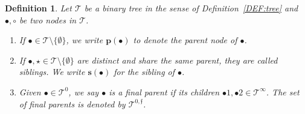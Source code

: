 \documentclass[%
11pt,  reqno]{amsart}
\newcommand{\5}{\textup{V}}
\newtheorem{definition}[theorem]{Definition}
\theoremstyle{remark}
\newcommand{\bul}{\bullet}
\newcommand{\TT}{\mathcal{T}}
\newcommand{\pb}{\mathbf{p}}
\newcommand{\gb}{\mathbf{g}}
\newcommand{\sbf}{\mathbf{s}}
\newcommand{\ff}{\mathfrak{f}}
\numberwithin{equation}{section}
\numberwithin{theorem}{section}
\begin{document}
\begin{definition}\rm
\label{DEF:tree2}
Let $\TT$ be a binary tree in the sense of Definition~\ref{DEF:tree} and 
$\bul, \circ$ be two nodes in $\TT$. 

\begin{enumerate}



\smallskip
\item[(i)]
If $\bul \in \TT\setminus \{ \emptyset\}$, we write $\pb(\bul)$ to denote the \emph{parent node} of $\bul$.

\smallskip
\item[(ii)] 
If $\bul, \star\in \TT \setminus\{ \emptyset \}$ are distinct and share the same parent, they are called \textit{siblings}. We write $\sbf(\bul)$ for the sibling of $\bul$. 


\smallskip
\item[(iii)] 
Given $\bul\in \TT^0$, we say $\bul$ is a \textit{final parent} if its children $\bul1, \bul2 \in \TT^\infty$. The set of final parents is denoted by $\TT^{0,\ff}$.


\end{enumerate}



\end{definition}
\end{document}
